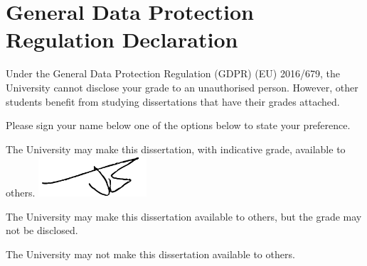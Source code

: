 
\section*{General Data Protection Regulation Declaration}
\vspace{0.5cm}
\begin{flushleft}
Under the General Data Protection Regulation (GDPR) (EU) 2016/679, the University cannot disclose your grade to an unauthorised person. However, other students benefit from studying dissertations that have their grades attached. \newline

\vspace{0.5cm}


Please sign your name below one of the options below to state your preference.\newline
\vspace{0.5cm}

The University may make this dissertation, with indicative grade, available to others.\newline
\includegraphics[height=1.5cm]{images/sig.png}
\vspace{1.5cm}


The University may make this dissertation available to others, but the grade may not be disclosed.\newline
\vspace{3cm}


The University may not make this dissertation available to others.\newline
\end{flushleft}


